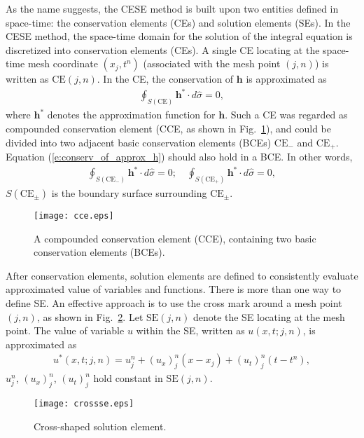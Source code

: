 \documentclass[11pt,dvips]{article}
\renewcommand{\figurename}{Fig.}
\numberwithin{equation}{section}
\begin{document}
As the name suggests, the CESE method is built upon two entities defined in
space-time: the conservation elements (CEs) and solution elements (SEs).  In
the CESE method, the space-time domain for the solution of the integral
equation is discretized into conservation elements (CEs).  A single CE locating
at the space-time mesh coordinate $(x_j, t^n)$ (associated with the mesh point
$(j,n)$) is written as $\mathrm{CE}(j,n)$.  In the CE, the conservation of
$\mathbf{h}$ is approximated as
\begin{align}
  \oint_{S(\mathrm{CE})}\mathbf{h}^*\cdot d\hat{\sigma} = 0,
    \label{e:conserv_of_approx_h}
\end{align}
where $\mathbf{h}^*$ denotes the approximation function for $\mathbf{h}$.  Such
a CE was regarded as compounded conservation element (CCE, as shown in
\figurename~\ref{f:cce}), and could be divided into two adjacent basic
conservation elements (BCEs) $\mathrm{CE}_-$ and $\mathrm{CE}_+$.  Equation
(\ref{e:conserv_of_approx_h}) should also hold in a BCE.  In other words,
\begin{align*}
  \oint_{S(\mathrm{CE}_-)}\mathbf{h}^*\cdot d\hat{\sigma} = 0; \quad
  \oint_{S(\mathrm{CE}_+)}\mathbf{h}^*\cdot d\hat{\sigma} = 0,
\end{align*}
$S(\mathrm{CE}_{\pm})$ is the boundary surface surrounding $\mathrm{CE}_{\pm}$.

\begin{figure}[htbp]
\centering
  \texttt{[image: cce.eps]}
  \caption{A compounded conservation element (CCE), containing two basic
  conservation elements (BCEs).}
  \label{f:cce}
\end{figure}

After conservation elements, solution elements are defined to consistently
evaluate approximated value of variables and functions.  There is more than one
way to define SE.  An effective approach is to use the cross mark around a mesh
point $(j,n)$, as shown in \figurename~\ref{f:crossse}.  Let $\mathrm{SE}(j,n)$
denote the SE locating at the mesh point.  The value of variable $u$ within the
SE, written as $u(x,t;j,n)$, is approximated as
\begin{align*}
  u^*(x,t;j,n) = u_j^n + (u_x)_j^n(x-x_j) + (u_t)_j^n(t-t^n),
\end{align*}
$u_j^n$, $(u_x)_j^n$, $(u_t)_j^n$ hold constant in $\mathrm{SE}(j,n)$.

\begin{figure}[hbtp]
  \centering
  \texttt{[image: crossse.eps]}
  \caption{Cross-shaped solution element.}
  \label{f:crossse}
\end{figure}
\end{document}
